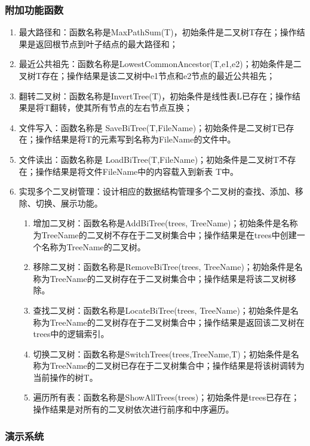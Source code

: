 \documentclass[supercite]{Experimental_Report}
\theoremstyle{definition}
\begin{document}
\subsubsection{附加功能函数}

\begin{enumerate}
    \item 最大路径和：函数名称是MaxPathSum(T)，初始条件是二叉树T存在；操作结果是返回根节点到叶子结点的最大路径和；
    \item 最近公共祖先：函数名称是LowestCommonAncestor(T,e1,e2)；初始条件是二叉树T存在；操作结果是该二叉树中e1节点和e2节点的最近公共祖先；
    \item 翻转二叉树：函数名称是InvertTree(T)，初始条件是线性表L已存在；操作结果是将T翻转，使其所有节点的左右节点互换；
	\item 文件写入：函数名称是 SaveBiTree(T,FileName)；初始条件是二叉树T已存在；操作结果是将T的元素写到名称为FileName的文件中。
	\item 文件读出：函数名称是 LoadBiTree(T,FileName)；初始条件是二叉树T不存在；操作结果是将文件FileName中的内容载入到新表 T中。
    \item 实现多个二叉树管理：设计相应的数据结构管理多个二叉树的查找、添加、移除、切换、展示功能。
	\begin{enumerate}
	\item 增加二叉树：函数名称是AddBiTree(trees, TreeName)；初始条件是名称为TreeName的二叉树不存在于二叉树集合中；操作结果是在trees中创建一个名称为TreeName的二叉树。
	\item 移除二叉树：函数名称是RemoveBiTree(trees, TreeName)；初始条件是名称为TreeName的二叉树存在于二叉树集合中；操作结果是将该二叉树移除。
	\item 查找二叉树：函数名称是LocateBiTree(trees, TreeName)；初始条件是名称为TreeName的二叉树存在于二叉树集合中；操作结果是返回该二叉树在trees中的逻辑索引。
	\item 切换二叉树：函数名称是SwitchTrees(trees,TreeName,T)；初始条件是名称为TreeName的二叉树已存在于二叉树集合中；操作结果是将该树调转为当前操作的树T。
	\item 遍历所有表：函数名称是ShowAllTrees(trees)；初始条件是trees已存在；操作结果是对所有的二叉树依次进行前序和中序遍历。
	\end{enumerate}
\end{enumerate}

\subsubsection{演示系统}
\end{document}
